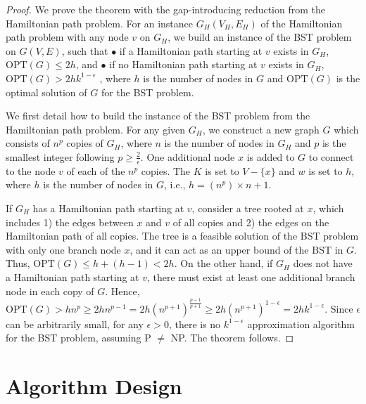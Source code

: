 \documentclass[conference]{IEEEtran}
\begin{document}
\begin{proof}
We prove the theorem with the gap-introducing reduction from the Hamiltonian
path problem. For an instance $G_{H}(V_{H},E_{H})$ of the Hamiltonian path
problem with any node $v$ on $G_{H}$, we build an instance of the BST
problem on $G(V,E)$, such that \newline
$\bullet $ if a Hamiltonian path starting at $v$ exists in $G_{H}$, $\mathrm{OPT}(G)\leq 2h$, and\newline
$\bullet $ if no Hamiltonian path starting at $v$ exists in $G_{H}$, $\mathrm{OPT}(G)>2hk^{1-\epsilon }$ \newline
, where $h$ is the number of nodes in $G$ and $\mathrm{OPT}(G)$ is the
optimal solution of $G$ for the BST problem.

We first detail how to build the instance of the BST problem from the
Hamiltonian path problem. For any given $G_{H}$, we construct a new graph $G$
which consists of $n^{p}$ copies of $G_{H}$, where $n$ is the number of
nodes in $G_{H}$ and $p$ is the smallest integer following $p\geq \frac{2}{\epsilon }$. One additional node $x$ is added to $G$ to connect to the node $v$ of each of the $n^{p}$ copies.
The $K$ is set to $V-\{x\}$ and $w$ is set to $h$, where $h$ is the number
of nodes in $G$, i.e., $h=(n^{p})\times n+1$.


If $G_{H}$ has a Hamiltonian path starting at $v$, consider a tree rooted at $x$, which
includes 1) the edges between $x$ and $v$ of all copies and 2) the edges on
the Hamiltonian path of all copies. The tree is a feasible solution of the
BST problem with only one branch node $x$, and it can act as an upper bound
of the BST in $G$.
Thus, $\mathrm{OPT}(G)\leq h+(h-1)<2h$. On the other hand, if $G_{H}$ does
not have a Hamiltonian path starting at $v$, there must exist at least one
additional branch node in each copy of $G$. Hence, $\mathrm{OPT}(G)>hn^{p}\geq 2hn^{p-1}=2h(n^{p+1})^{\frac{p-1}{p+1}}\geq
2h(n^{p+1})^{1-\epsilon }=2hk^{1-\epsilon }$. Since $\epsilon $ can be
arbitrarily small, for any $\epsilon >0$, there is no $k^{1-\epsilon }$
approximation algorithm for the BST problem, assuming P $\neq $ NP. The theorem
follows.
\end{proof}

\section{Algorithm Design}
\end{document}
